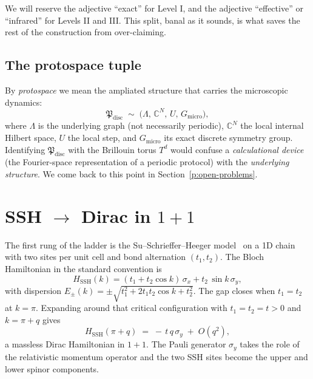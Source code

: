 \documentclass[a4paper,onecolumn,11pt]{quantumarticle}
\newcommand{\bbC}{\ensuremath{\mathbb{C}}}
\newcommand{\Hop}{\ensuremath{H}}
\newcommand{\Uop}{\ensuremath{U}}
\newcommand{\Lattice}{\ensuremath{\Lambda}}
\newcommand{\Proto}{\ensuremath{\mathfrak{P}_{\mathrm{disc}}}}
\begin{document}
We will reserve the adjective \enquote{exact} for Level I, and the
adjective \enquote{effective} or \enquote{infrared} for Levels II and
III. This split, banal as it sounds, is what saves the rest of the
construction from over-claiming.

\subsection{The protospace tuple}
By \emph{protospace} we mean the ampliated structure that carries the
microscopic dynamics:
\begin{equation}
\Proto \;\sim\; \bigl(\Lattice,\,\bbC^{N},\,\Uop,\,G_{\mathrm{micro}}\bigr) ,
\label{p:eq:proto-tuple}
\end{equation}
where $\Lattice$ is the underlying graph (not necessarily periodic),
$\bbC^{N}$ the local internal Hilbert space, $\Uop$ the local step, and
$G_{\mathrm{micro}}$ its exact discrete symmetry group. Identifying
$\Proto$ with the Brillouin torus $T^{d}$ would confuse a
\emph{calculational device} (the Fourier-space representation of a
periodic protocol) with the \emph{underlying structure}. We come back to
this point in Section~\ref{p:open-problems}.


\section{SSH \texorpdfstring{$\rightarrow$}{->} Dirac in \texorpdfstring{$1{+}1$}{(1+1)}}
\label{p:ssh}

The first rung of the ladder is the Su--Schrieffer--Heeger model~\cite{Su1979} on a
1D chain with two sites per unit cell and bond alternation $(t_1, t_2)$.
The Bloch Hamiltonian in the standard convention is
\begin{equation}
\Hop_{\mathrm{SSH}}(k)
    = (t_1 + t_2 \cos k)\,\sigma_x + t_2\,\sin k\,\sigma_y ,
\label{p:eq:HSSH}
\end{equation}
with dispersion
$E_{\pm}(k) = \pm\sqrt{t_1^2 + 2 t_1 t_2 \cos k + t_2^2}$.
The gap closes when $t_1 = t_2$ at $k = \pi$. Expanding around that
critical configuration with $t_1 = t_2 = t > 0$ and $k = \pi + q$ gives
\begin{equation}
\Hop_{\mathrm{SSH}}(\pi + q) \;=\; -\,t\,q\,\sigma_y \;+\; O(q^2),
\label{p:eq:SSH-Dirac1+1}
\end{equation}
a massless Dirac Hamiltonian in $1{+}1$. The Pauli generator
$\sigma_y$ takes the role of the relativistic momentum operator and the
two SSH sites become the upper and lower spinor components.
\end{document}
